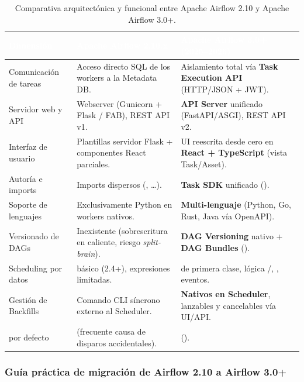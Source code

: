 \begin{table}[htbp]
\centering
\caption{Comparativa arquitectónica y funcional entre Apache Airflow 2.10 y Apache Airflow 3.0+.}
\label{tab:airflow2-vs-airflow3}
\footnotesize
\begin{tabularx}{\textwidth}{@{}L{2.8cm} Y Y@{}}
\toprule
{}
\textcolor{white}{\sffamily\bfseries Dimensión} &
\textcolor{white}{\sffamily\bfseries Apache Airflow 2.10.x} &
\textcolor{white}{\sffamily\bfseries Apache Airflow 3.0+ (2025--2026)} \\
\midrule
Comunicación de tareas & Acceso directo SQL de los workers a la Metadata DB. & Aislamiento total vía \textbf{Task Execution API} (HTTP/JSON + JWT). \\
Servidor web y API & Webserver (Gunicorn + Flask / FAB), REST API v1. & \textbf{API Server} unificado (FastAPI/ASGI), REST API v2. \\
Interfaz de usuario & Plantillas servidor Flask + componentes React parciales. & UI reescrita desde cero en \textbf{React + TypeScript} (vista Task/Asset). \\
Autoría e imports & Imports dispersos (, \ldots). & \textbf{Task SDK} unificado (). \\
Soporte de lenguajes & Exclusivamente Python en workers nativos. & \textbf{Multi-lenguaje} (Python, Go, Rust, Java vía OpenAPI). \\
Versionado de DAGs & Inexistente (sobrescritura en caliente, riesgo \textit{split-brain}). & \textbf{DAG Versioning} nativo + \textbf{DAG Bundles} (). \\
Scheduling por datos &  básico (2.4+), expresiones limitadas. & \textbf{} de primera clase, lógica \code{\&}/\code{|}, , eventos. \\
Gestión de Backfills & Comando CLI síncrono externo al Scheduler. & \textbf{Nativos en Scheduler}, lanzables y cancelables vía UI/API. \\
 por defecto &  (frecuente causa de disparos accidentales). &  (). \\
\bottomrule
\end{tabularx}
\end{table}

\subsubsection{Guía práctica de migración de Airflow 2.10 a Airflow 3.0+}


